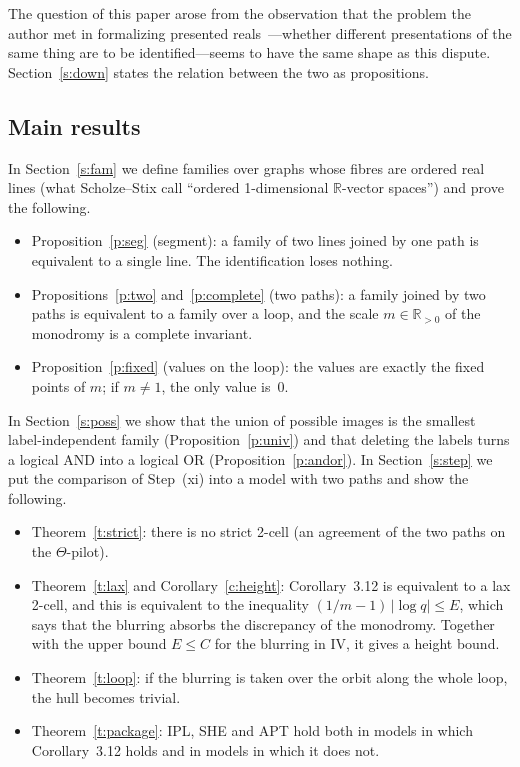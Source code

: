 \documentclass[11pt,a4paper]{article}
\newcommand{\Rp}{\mathbb{R}_{>0}}
\newcommand{\q}[1]{``#1''}
\theoremstyle{plain}
\theoremstyle{definition}
\theoremstyle{remark}
\begin{document}
The question of this paper arose from the observation that the problem the author met in formalizing presented
reals~\cite{U}---whether different presentations of the same thing are to be identified---seems to have the same shape
as this dispute. Section~\ref{s:down} states the relation between the two as propositions.

\subsection{Main results}
In Section~\ref{s:fam} we define families over graphs whose fibres are ordered real lines (what Scholze--Stix call
\q{ordered 1-dimensional $\mathbb{R}$-vector spaces}) and prove the following.
\begin{itemize}
\item Proposition~\ref{p:seg} (segment): a family of two lines joined by one path is equivalent to a single line. The
identification loses nothing.
\item Propositions~\ref{p:two} and~\ref{p:complete} (two paths): a family joined by two paths is equivalent to a family
over a loop, and the scale $m\in\Rp$ of the monodromy is a complete invariant.
\item Proposition~\ref{p:fixed} (values on the loop): the values are exactly the fixed points of $m$; if $m\ne1$, the
only value is~$0$.
\end{itemize}
In Section~\ref{s:poss} we show that the union of possible images is the smallest label-independent family
(Proposition~\ref{p:univ}) and that deleting the labels turns a logical AND into a logical OR (Proposition~\ref{p:andor}).
In Section~\ref{s:step} we put the comparison of Step~(xi) into a model with two paths and show the following.
\begin{itemize}
\item Theorem~\ref{t:strict}: there is no strict 2-cell (an agreement of the two paths on the $\Theta$-pilot).
\item Theorem~\ref{t:lax} and Corollary~\ref{c:height}: Corollary~3.12 is equivalent to a lax 2-cell, and this is
equivalent to the inequality $(1/m-1)\,|\log q|\le E$, which says that the blurring absorbs the discrepancy of the
monodromy. Together with the upper bound $E\le C$ for the blurring in IV, it gives a height bound.
\item Theorem~\ref{t:loop}: if the blurring is taken over the orbit along the whole loop, the hull becomes trivial.
\item Theorem~\ref{t:package}: IPL, SHE and APT hold both in models in which Corollary~3.12 holds and in models in which
it does not.
\end{itemize}
\end{document}

